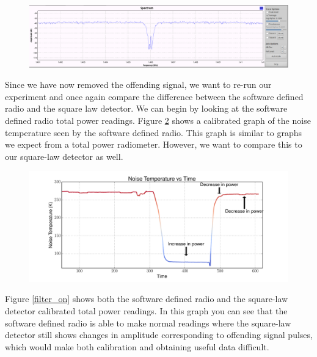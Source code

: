 \begin{figure}[h!tb] \centering
\includegraphics[width=\textwidth]{Images/interfering_signal.png}
\label{spectrum_filter}
\end{figure}

Since we have now removed the offending signal, we want to re-run our experiment and once again compare the difference between the software defined radio and the square law detector. We can begin by looking at the software defined radio total power readings.  Figure \ref{sdr_calib_filter} shows a calibrated graph of the noise temperature seen by the software defined radio.  This graph is similar to graphs we expect from a total power radiometer.  However, we want to compare this to our square-law detector as well.  

\begin{figure}[h!tb] \centering
\includegraphics[width=\textwidth]{Experiments/Exp4/calib_filtered.pdf}
\label{sdr_calib_filter}
\end{figure}

Figure \ref{filter_on} shows both the software defined radio and the square-law detector calibrated total power readings.  In this graph you can see that the software defined radio is able to make normal readings where the square-law detector still shows changes in amplitude corresponding to offending signal pulses, which would make both calibration and obtaining useful data difficult.

